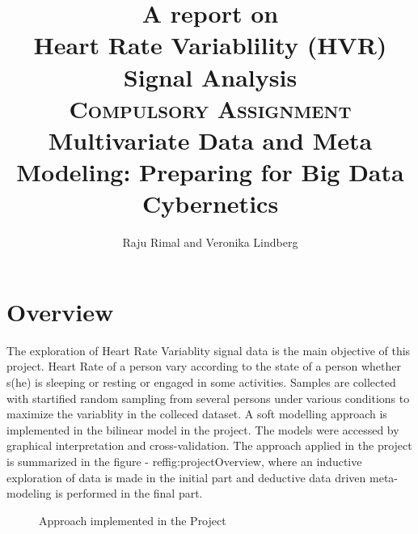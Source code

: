 \documentclass[a4paper, 11pt]{report}\usepackage[]{graphicx}\usepackage[]{color}
\title{\Large{A report on} \\ \vspace{0.5cm}
Heart Rate Variablility (HVR) Signal Analysis \\ \vfill 
\Large{\textsc{Compulsory Assignment} \\ \vspace{1cm}
Multivariate Data and Meta Modeling: Preparing for Big Data Cybernetics} \vfill}
\author{Raju Rimal and Veronika Lindberg}
\numberwithin{figure}{section}
\begin{document}
\maketitle
\tableofcontents

\chapter{Overview}
The exploration of Heart Rate Variablity signal data is the main objective of this project. Heart Rate of a person vary according to the state of a person whether s(he) is sleeping or resting or engaged in some activities. Samples are collected with startified random sampling from several persons under various conditions to maximize the variablity in the colleced dataset. A soft modelling approach is implemented in the bilinear model in the project. The models were accessed by graphical interpretation and cross-validation. The approach applied in the project is summarized in the figure - ref{fig:projectOverview}, where an inductive exploration of data is made in the initial part and deductive data driven meta-modeling is performed in the final part.

\begin{figure}[H]
\caption{Approach implemented in the Project}
\label{fig:projectOverview}
\end{figure}
\end{document}
